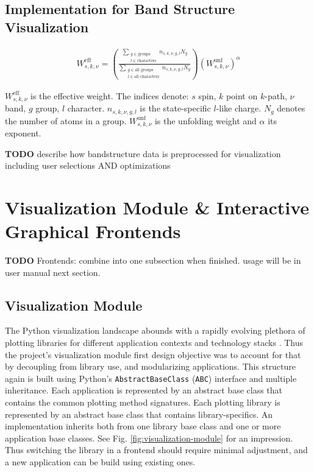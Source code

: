 \subsection{Implementation for Band Structure Visualization}
\label{sec:preprocessor-implementation}

\begin{align}
  W^{\text{eff}}_{s,k,\nu} = \left( \frac{\sum\limits_{\substack{g \in \text{groups} \\ l \in \text{characters}}} n_{s,k,\nu,g,l} N_g}{\sum\limits_{\substack{g \in \text{all groups} \\ l \in \text{all characters}}} n_{s,k,\nu,g,l} N_g} \right) \left(W_{s,k,\nu}^{\text{unf}}\right)^\alpha
\end{align}

\(W^{\text{eff}}_{s,k,\nu}\) is the effective weight. The indices denote: \(s\)
spin, \(k\) point on \(k\)-path, \(\nu\) band, \(g\) group, \(l\) character.
\(n_{s,k,\nu,g,l}\) is the state-specific \(l\)-like charge. \(N_g\) denotes the
number of atoms in a group. \(W_{s,k,\nu}^{\text{unf}}\) is the unfolding weight
and \(\alpha\) its exponent.


\textbf{TODO} describe how bandstructure data is preprocessed for visualization
including user selections AND optimizations

\section{Visualization Module \& Interactive Graphical Frontends}
\label{sec:visualization-module}

\textbf{TODO} Frontends: combine into one subsection when finished. usage will
be in user manual next section.

\subsection{Visualization Module}
\label{sec:visualization-interface}

The Python visualization landscape abounds with a rapidly evolving plethora of
plotting libraries for different application contexts and technology stacks
\cite{python-viz-landscape}. Thus the project's visualization module first
design objective was to account for that by decoupling from library use, and
modularizing applications. This structure again is built using Python's
\texttt{AbstractBaseClass} (\texttt{ABC}) interface and multiple inheritance.
Each application is represented by an abstract base class that contains the
common plotting method signatures. Each plotting library is represented by an
abstract base class that contains library-specifics. An implementation inherits
both from one library base class and one or more application base classes. See
Fig. \ref{fig:visualization-module} for an impression. Thus switching the
library in a frontend should require minimal adjustment, and a new application
can be build using existing ones.

